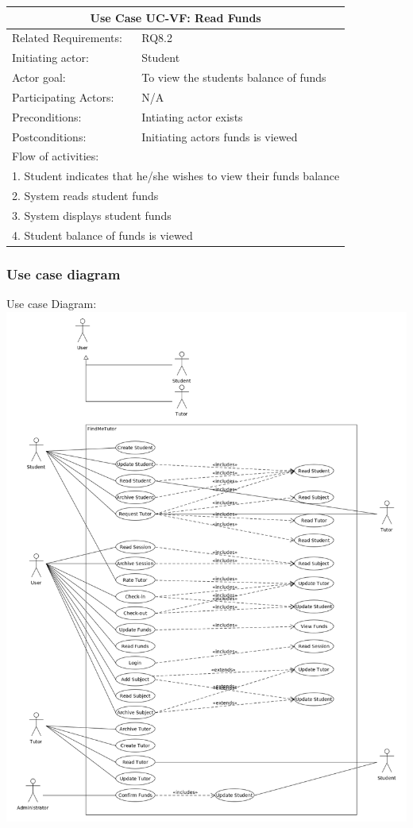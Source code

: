 \documentclass[12pt]{article}
\begin{document}
		\begin{tabular}{| l | p{10cm}| }
      \hline\multicolumn{2}{|c|}{ \textbf{Use Case UC-VF: Read Funds} }\\ \hline
      Related Requirements: &RQ8.2\\ \hline
      Initiating actor: & Student\\ \hline
      Actor goal: &To view the students balance of funds\\ \hline
      Participating Actors: &N/A\\ \hline
      Preconditions: &Intiating actor exists\\ \hline
      Postconditions: &Initiating actors funds is viewed \\ \hline
      \multicolumn{2}{|l|}{Flow of activities:}\\ \hline
      \multicolumn{2}{|p{15cm}|}{1. Student indicates that he/she wishes to view their funds balance}\\
      \multicolumn{2}{|p{15cm}|}{2. System reads student funds}\\
      \multicolumn{2}{|l|}{3. System displays student funds}\\
      \multicolumn{2}{|l|}{4. Student balance of funds is viewed}\\
       \hline
    \end{tabular}

	\newpage
\subsubsection{Use case diagram}
Use case Diagram:
		\centering
		\includegraphics[width=140mm]{./Sprint3Models/Use_Case_Diagram.png}
\end{document}
